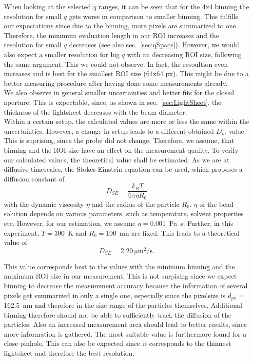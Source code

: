 When looking at the selected $q$ ranges, it can be seen that for the 4x4 binning the resolution for small $q$ gets worse in comparison to smaller binning. This fulfills our expectations since due to the binning, more pixels are summarized to one. Therefore, the minimum evaluation length in our ROI increases and the resolution for small $q$ decreases (see also sec.~\ref{sec:qSpace}). However, we would also expect a smaller resolution for big $q$ with an decreasing ROI size, following the same argument. This we could not observe. In fact, the resoultion even increases and is best for the smallest ROI size (64x64 px). This might be due to a better measuring procedure after having done some measurements already. \\
We also observe in general smaller uncertainties and better fits for the closed aperture. This is expectable, since, as shown in sec.~\ref{sec:LightSheet}, the thickness of the lightsheet decreases with the beam diameter. \\
Within a certain setup, the calculated values are more or less the same within the uncertainties. However, a change in setup leads to a different obtained $D_m$ value. This is suprising, since the probe did not change. Therefore, we assume, that binning and the ROI size have an effect on the measurement quality. To verify our calculated values, the theoretical value shall be estimated. As we are at diffusive timescales, the Stokes-Einstein-equation can be used, which proposes a diffusion constant of 
\begin{equation}
    D_{SE} = \frac{k_BT}{6 \pi \eta R_0}
\end{equation}
with the dynamic viscosity $\eta$ and the radius of the particle $R_0$. $\eta$ of the bead solution depends on various parameters, such as temperature, solvent properties etc. However, for our estimation, we assume $\eta = $\SI{0.001}{\pascal\second}. Further, in this experiment, $T=$\SI{300}{\kelvin} and $R_0=$\SI{100}{\nano\meter} are fixed. This leads to a theoretical value of 
\begin{equation}
    D_{SE} = \SI{2.20}{\micro\meter^2 \per\second}.
\end{equation}

This value corresponds best to the values with the minimum binning and the maximum ROI size in our measurement. This is not surpising since we expect binning to decrease the measurement accuracy because the information of several pixels get summarized in only a single one, especially since the pixelsize is $d_{px} = $\SI{162.5}{\nano\meter} and therefore in the size range of the particles themselves. Additional binning therefore should not be able to sufficiently track the diffusion of the particles. Also an increased measurement area should lead to better results, since more information is gathered. The most suitable value is furthermore found for a close pinhole. This can also be expected since it corresponds to the thinnest lightsheet and therefore the best resolution. 